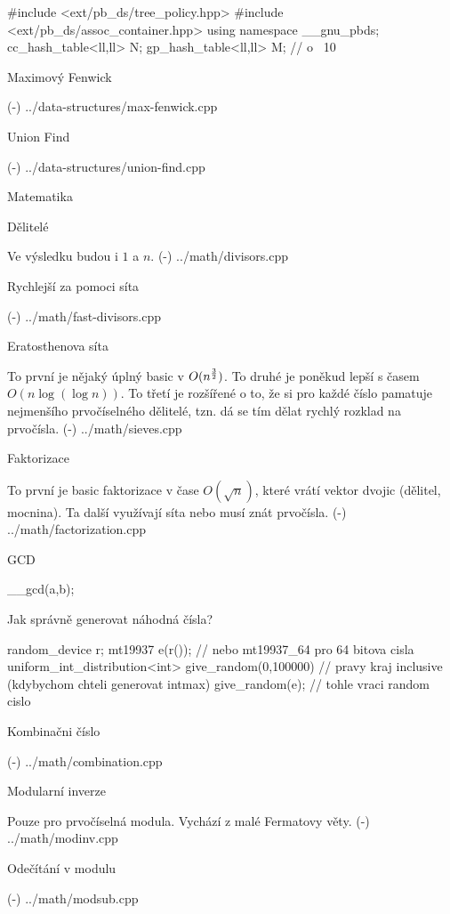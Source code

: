 \begtt
#include <ext/pb_ds/tree_policy.hpp>
#include <ext/pb_ds/assoc_container.hpp>
using namespace __gnu_pbds;
cc_hash_table<ll,ll> N;
gp_hash_table<ll,ll> M; // o ~10%
\endtt

\sec Maximový Fenwick 

\verbinput (-) ../data-structures/max-fenwick.cpp

\sec Union Find 

\verbinput (-) ../data-structures/union-find.cpp

\newpage

\chap Matematika

\sec Dělitelé 

Ve výsledku budou i $1$ a $n$.
\verbinput (-) ../math/divisors.cpp

\secc Rychlejší za pomoci síta 

\verbinput (-) ../math/fast-divisors.cpp

\sec Eratosthenova síta 

To první je nějaký úplný basic v $O(n^{3 \over 2})$. To druhé je poněkud lepší s časem $O(n\log(\log n))$. To třetí je rozšířené o to, že si pro každé číslo pamatuje nejmenšího prvočíselného dělitelé, tzn. dá se tím dělat rychlý rozklad na prvočísla.
\verbinput (-) ../math/sieves.cpp

\sec Faktorizace 

To první je basic faktorizace v čase $O(\sqrt n)$, které vrátí vektor dvojic (dělitel, mocnina). Ta další využívají síta nebo musí znát prvočísla.
\verbinput (-) ../math/factorization.cpp

\sec GCD 

\begtt
__gcd(a,b);
\endtt

\sec Jak správně generovat náhodná čísla? 

\begtt
  random_device r;
  mt19937 e(r()); // nebo mt19937_64 pro 64 bitova cisla
  uniform_int_distribution<int> give_random(0,100000) // pravy kraj inclusive (kdybychom chteli generovat intmax)
  give_random(e); // tohle vraci random cislo
\endtt

\sec Kombinačni číslo 

\verbinput (-) ../math/combination.cpp

\sec Modularní inverze 

Pouze pro prvočíselná modula. Vychází z malé Fermatovy věty.
\verbinput (-) ../math/modinv.cpp

\sec Odečítání v modulu 

\verbinput (-) ../math/modsub.cpp

